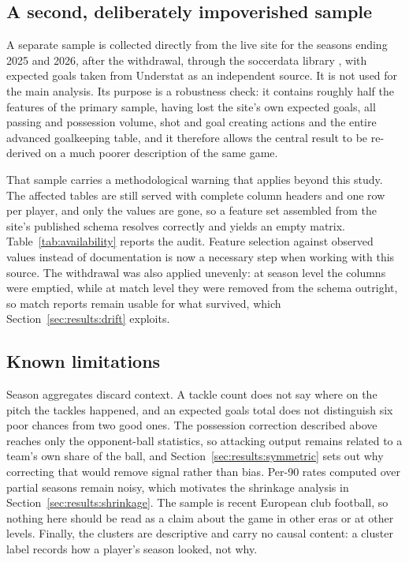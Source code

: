 \subsection{A second, deliberately impoverished sample}
\label{sec:data:reduced}

A separate sample is collected directly from the live site for the seasons ending 2025 and
2026, after the withdrawal, through the soccerdata library \citep{robberechts2026soccerdata},
with expected goals taken from Understat \citep{understat2026} as an independent source. It
is not used for the main analysis. Its purpose is a robustness check: it contains roughly
half the features of the primary sample, having lost the site's own expected goals, all
passing and possession volume, shot and goal creating actions and the entire advanced
goalkeeping table, and it therefore allows the central result to be re-derived on a much
poorer description of the same game.

That sample carries a methodological warning that applies beyond this study.
The affected tables are still served with complete column headers and one row per player,
and only the values are gone, so a feature set assembled from the site's published schema
resolves correctly and yields an empty matrix. Table~\ref{tab:availability} reports the
audit. Feature selection against observed values instead of documentation is now a
necessary step when working with this source. The withdrawal was also applied unevenly: at
season level the columns were emptied, while at match level they were removed from the
schema outright, so match reports remain usable for what survived, which
Section~\ref{sec:results:drift} exploits.



\subsection{Known limitations}

Season aggregates discard context. A tackle count does not say where on the pitch the
tackles happened, and an expected goals total does not distinguish six poor chances from
two good ones. The possession correction described above reaches only the opponent-ball
statistics, so attacking output remains related to a team's own share of the ball, and
Section~\ref{sec:results:symmetric} sets out why correcting that would remove signal rather
than bias. Per-90 rates computed over partial seasons remain noisy, which motivates the
shrinkage analysis in Section~\ref{sec:results:shrinkage}. The sample is recent European
club football, so nothing here should be read as a claim about the game in other eras or at
other levels. Finally, the clusters are descriptive and carry no causal content: a cluster
label records how a player's season looked, not why.
